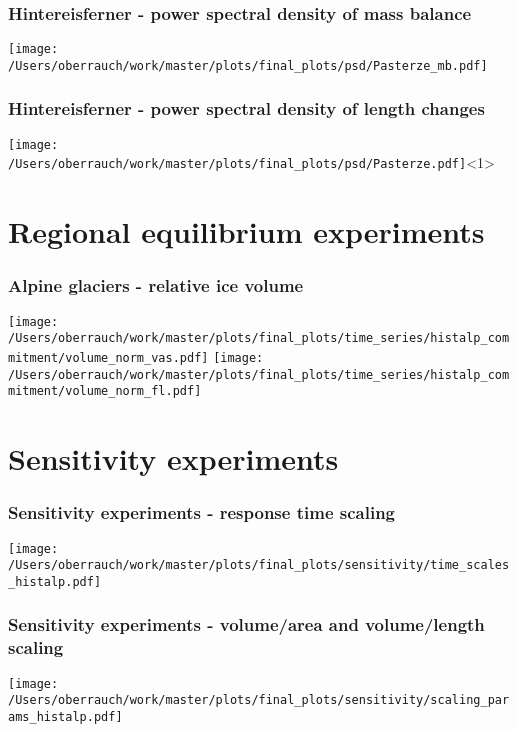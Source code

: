 \documentclass[12pt, aspectratio=169, abstract=off, oneside]{beamer}
\begin{document}
    \begin{frame}[t]\frametitle{Hintereisferner - power spectral density of mass balance}
        \addtocounter{framenumber}{-1}
        \centering
        \vfill
        \texttt{[image: /Users/oberrauch/work/master/plots/final\_plots/psd/Pasterze\_mb.pdf]}
    
    \end{frame}

    \begin{frame}[t]\frametitle{Hintereisferner - power spectral density of length changes}
        \addtocounter{framenumber}{-1}
        \centering
        \vfill
        \texttt{[image: /Users/oberrauch/work/master/plots/final\_plots/psd/Pasterze.pdf]}<1>
    
    \end{frame}


\section{Regional equilibrium experiments} %
\label{sec:regional_equilibrium_experiments}

    \begin{frame}[t]\frametitle{Alpine glaciers - relative ice volume}
        \centering
        \vfill
        \texttt{[image: /Users/oberrauch/work/master/plots/final\_plots/time\_series/histalp\_commitment/volume\_norm\_vas.pdf]}
        \texttt{[image: /Users/oberrauch/work/master/plots/final\_plots/time\_series/histalp\_commitment/volume\_norm\_fl.pdf]}
    \end{frame}


\section{Sensitivity experiments} %
\label{sec:sensitivity_experiments}

    \begin{frame}[t]\frametitle{Sensitivity experiments - response time scaling}
        \centering
        \vfill
        \texttt{[image: /Users/oberrauch/work/master/plots/final\_plots/sensitivity/time\_scales\_histalp.pdf]}
    \end{frame}

    \begin{frame}[t]\frametitle{Sensitivity experiments - volume/area and volume/length scaling}
        \addtocounter{framenumber}{-1}
        \centering
        \vfill
        \texttt{[image: /Users/oberrauch/work/master/plots/final\_plots/sensitivity/scaling\_params\_histalp.pdf]}
    \end{frame}
\end{document}
